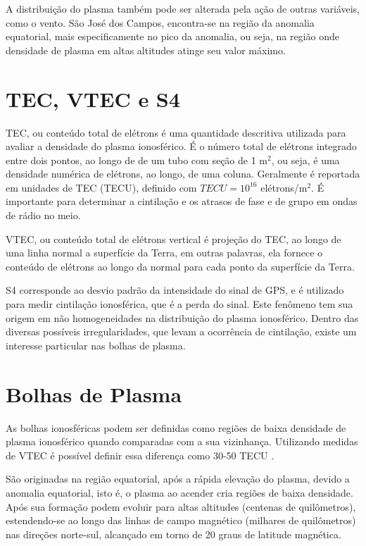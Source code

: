 A distribuição do plasma também pode ser alterada pela ação de outras variáveis, como o vento. São José dos Campos, encontra-se na região da anomalia equatorial, mais especificamente no pico da anomalia, ou seja, na região onde densidade de plasma em altas altitudes atinge seu valor máximo.

\section{TEC, VTEC e S4}
TEC, ou conteúdo total de elétrons é uma quantidade descritiva utilizada para avaliar a densidade do plasma ionosférico. É o número total de elétrons integrado entre dois pontos, ao longo de de um tubo com seção de 1 m$^2$, ou seja, é uma densidade numérica de elétrons, ao longo, de uma coluna. Geralmente é reportada em unidades de TEC (TECU), definido com $TECU=10^{16}$ elétrons/m$^2$. É importante para determinar a cintilação e os atrasos de fase e de grupo em ondas de rádio no meio.

VTEC, ou conteúdo total de elétrons vertical é projeção do TEC, ao longo de uma linha normal a superfície da Terra, em outras palavras, ela fornece o conteúdo de elétrons ao longo da normal para cada ponto da superfície da Terra.

S4 corresponde ao desvio padrão da intensidade do sinal de GPS, e é utilizado para medir cintilação ionosférica, que é a perda do sinal. Este fenômeno tem sua origem em não homogeneidades na distribuição do plasma ionosférico. Dentro das diversas possíveis irregularidades, que levam a ocorrência de cintilação, existe um interesse particular nas bolhas de plasma.

\section{Bolhas de Plasma}

As bolhas ionosféricas podem ser definidas como regiões de baixa densidade de plasma ionosférico quando comparadas com a sua vizinhança. Utilizando medidas de VTEC é possível definir essa diferença como 30-50 TECU \cite{TAKAHASHI:2006}.

São originadas na região equatorial, após a rápida elevação do plasma, devido a anomalia equatorial, isto é, o plasma ao acender cria regiões de baixa densidade. Após sua formação podem evoluir para altas altitudes (centenas de quilômetros), estendendo-se ao longo das linhas de campo magnético (milhares de quilômetros) nas direções norte-sul, alcançado em torno de 20 graus de latitude magnética.
